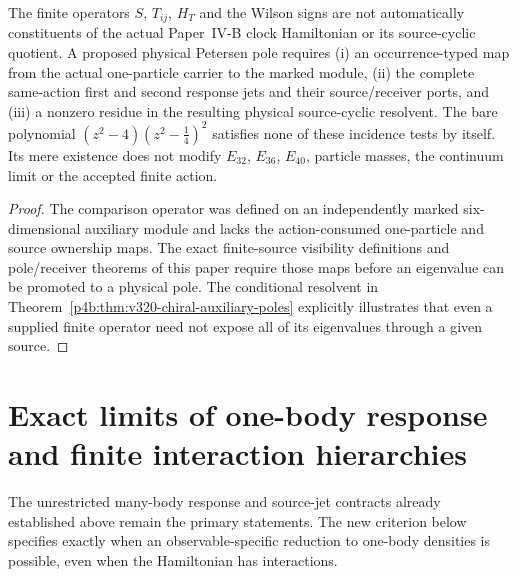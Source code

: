 \documentclass[12pt,a4paper]{article}
\begin{document}
\begin{proposition}
\label{p4b:prop:v320-source-incidence-boundary}
The finite operators $S$, $T_{ij}$, $H_T$ and the Wilson signs are
not automatically constituents of the actual Paper~IV-B clock
Hamiltonian or its source-cyclic quotient. A proposed physical
Petersen pole requires (i) an occurrence-typed map from the actual
one-particle carrier to the marked module, (ii) the complete
same-action first and second response jets and their source/receiver
ports, and (iii) a nonzero residue in the resulting physical
source-cyclic resolvent. The bare polynomial
$(z^2-4)(z^2-\frac14)^2$ satisfies none of these incidence tests by
itself. Its mere existence does not modify $E_{32}$, $E_{36}$,
$E_{40}$, particle masses, the continuum limit or the accepted
finite action.
\end{proposition}
\begin{proof}
The comparison operator was defined on an independently marked
six-dimensional auxiliary module and lacks the action-consumed
one-particle and source ownership maps. The exact finite-source
visibility definitions and pole/receiver theorems of this paper
require those maps before an eigenvalue can be promoted to a
physical pole. The conditional resolvent in
Theorem~\ref{p4b:thm:v320-chiral-auxiliary-poles} explicitly
illustrates that even a supplied finite operator need not expose
all of its eigenvalues through a given source.
\end{proof}



\section{Exact limits of one-body response and finite interaction hierarchies}
\label{p4b:sec:v347-response-closure}
The unrestricted many-body response and source-jet contracts already
established above remain the primary statements.  The new criterion below
specifies exactly when an observable-specific reduction to one-body
densities is possible, even when the Hamiltonian has interactions.
\end{document}
